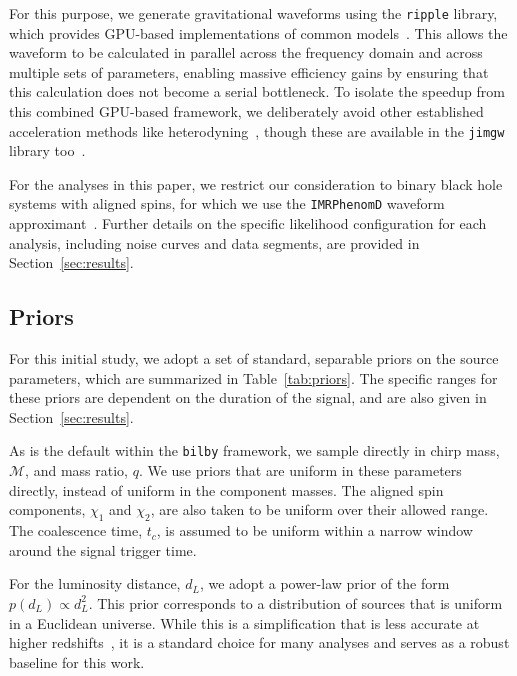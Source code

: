 \documentclass[fleqn,usenatbib]{mnras}
\begin{document}
For this purpose, we generate gravitational waveforms using the
\texttt{ripple} library, which provides GPU-based implementations of
common models~\citep{ripple, wong2023fastgravitationalwaveparameter, Wouters_BNS}. 
This allows the waveform to be calculated
in parallel across the frequency domain and 
across multiple sets of parameters, enabling massive efficiency gains by 
ensuring that this calculation does not become a serial bottleneck.
To isolate the speedup from this combined GPU-based framework,
we deliberately avoid other established acceleration methods like 
heterodyning~\citep{TL_relativebinning, relativebinning2, relativebinning3, relativebinning4}, 
though these are available in the \texttt{jimgw} library too~\citep{wong2023fastgravitationalwaveparameter}.

For the analyses in this paper, we restrict our consideration to binary
black hole systems with aligned spins, for which we use the
\texttt{IMRPhenomD} waveform approximant~\citep{Khan:2015jqa}.
Further details on the specific likelihood configuration for each
analysis, including noise curves and data segments, are provided in Section~\ref{sec:results}.

\subsection{Priors}

For this initial study, we adopt a set of standard, separable priors on
the source parameters, which are summarized in Table~\ref{tab:priors}.
The specific ranges for these priors are dependent on the duration of the signal, and are
also given in Section~\ref{sec:results}.

As is the default within the \texttt{bilby} framework, we sample directly in chirp mass, $\mathcal{M}$, and
mass ratio, $q$. We use priors that are uniform in these parameters directly, instead of uniform in the component masses. 
The aligned spin components, $\chi_1$ and $\chi_2$, are also taken to be uniform over
their allowed range. The coalescence time, $t_c$, is assumed to be uniform
within a narrow window around the signal trigger time.

For the luminosity distance, $d_L$, we adopt a power-law prior of the
form $p(d_L) \propto d_L^2$. This prior corresponds to a distribution of
sources that is uniform in a Euclidean universe. While this is a
simplification that is less accurate at higher redshifts~\citep{bilby_validation}, it is a
standard choice for many analyses and serves as a robust baseline for
this work.
\end{document}
